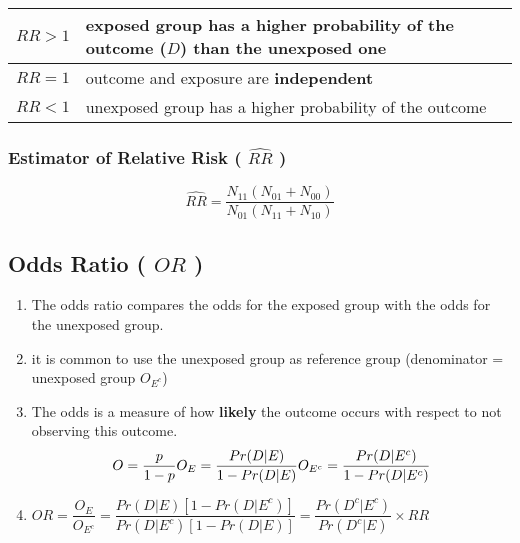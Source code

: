 \begin{customTableWrapper}{1.5}
\begin{table}[H]
    \centering
    \begin{tabular}{|l|p{9cm}|}
        \hline

        $RR > 1$ & exposed group has a higher probability of the outcome ($D$) than the unexposed one \\
        \hline

        $RR = 1$ & outcome and exposure are \textbf{independent} \\
        \hline

        $RR < 1$ & unexposed group has a higher probability of the outcome \\
        \hline

    \end{tabular}
\end{table}
\end{customTableWrapper}

\subsubsection{Estimator of Relative Risk ( $\hat{RR}$ ) \cite{ism-1}}\label{Estimator of Relative Risk}

\[
    \hat{RR}
    = \dfrac{N_{11}(N_{01} + N_{00})}{N_{01}(N_{11} + N_{10})}
\]



\subsection{Odds Ratio ( $OR$ ) \cite{ism-1}} \label{Odds Ratio}

\begin{enumerate}[itemsep=0.2cm]
    \item The odds ratio compares the odds for the exposed group with the odds for the unexposed group.

    \item it is common to use the unexposed group as reference group (denominator = unexposed group $O_{E^c}$)

    \item The odds is a measure of how \textbf{likely} the outcome occurs with respect to not observing this outcome.
    \[
        \hfill
        O = \dfrac{p}{1-p}
        \hfill
        O_E = \dfrac{Pr (D|E)}{1 - Pr (D|E)}
        \hfill
        O_{E^c} = \dfrac{Pr (D|E^c)}{1 - Pr (D|E^c)}
        \hfill
    \]

    \item $
        OR 
        = \dfrac{O_E}{O_{E^c}}
        = \dfrac{Pr (D|E)[1 - Pr (D|E^c)]}{Pr (D|E^c)[1 - Pr (D|E)]}
        = \dfrac{Pr (D^c|E^c)}{Pr (D^c|E)} \times RR
    $

\end{enumerate}

